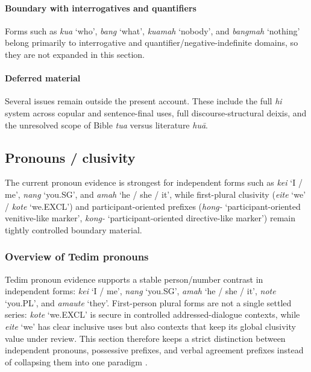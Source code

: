 \documentclass[
  11pt,
  a4paper,
]{article}
\newcommand{\tdim}[1]{\textit{#1}}
\newcommand{\glossquote}[1]{`#1'}
\begin{document}
\paragraph{Boundary with interrogatives and
quantifiers}\label{boundary-with-interrogatives-and-quantifiers}

Forms such as \tdim{kua} \glossquote{who}, \tdim{bang}
\glossquote{what}, \tdim{kuamah} \glossquote{nobody}, and \tdim{bangmah}
\glossquote{nothing} belong primarily to interrogative and
quantifier/negative-indefinite domains, so they are not expanded in this
section.

\paragraph{Deferred material}\label{deferred-material-1}

Several issues remain outside the present account. These include the
full \tdim{hi} system across copular and sentence-final uses, full
discourse-structural deixis, and the unresolved scope of Bible
\tdim{tua} versus literature \tdim{huā}.

\subsection{Pronouns / clusivity}\label{pronouns-clusivity}

The current pronoun evidence is strongest for independent forms such as
\tdim{kei} \glossquote{I / me}, \tdim{nang} \glossquote{you.SG}, and
\tdim{amah} \glossquote{he / she / it}, while first-plural clusivity
(\tdim{eite} \glossquote{we} / \tdim{kote} \glossquote{we.EXCL}) and
participant-oriented prefixes (\tdim{hong-}
\glossquote{participant-oriented venitive-like marker}, \tdim{kong-}
\glossquote{participant-oriented directive-like marker}) remain tightly
controlled boundary material.

\subsubsection{Overview of Tedim
pronouns}\label{overview-of-tedim-pronouns}

Tedim pronoun evidence supports a stable person/number contrast in
independent forms: \tdim{kei} \glossquote{I / me}, \tdim{nang}
\glossquote{you.SG}, \tdim{amah} \glossquote{he / she / it}, \tdim{note}
\glossquote{you.PL}, and \tdim{amaute} \glossquote{they}. First-person
plural forms are not a single settled series: \tdim{kote}
\glossquote{we.EXCL} is secure in controlled addressed-dialogue
contexts, while \tdim{eite} \glossquote{we} has clear inclusive uses but
also contexts that keep its global clusivity value under review. This
section therefore keeps a strict distinction between independent
pronouns, possessive prefixes, and verbal agreement prefixes instead of
collapsing them into one paradigm
\citep{henderson1965, zamngaihcing2017}.
\end{document}
